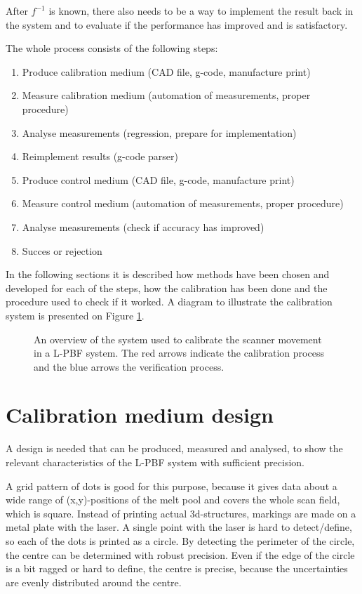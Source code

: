 After $f^{-1}$ is known, there also needs to be a way to implement the result back in the system and to evaluate if the performance has improved and is satisfactory.

The whole process consists of the following steps:
\begin{enumerate}
    \item Produce calibration medium (CAD file, g-code, manufacture print)
    \item Measure calibration medium (automation of measurements, proper procedure)
    \item Analyse measurements (regression, prepare for implementation)
    \item Reimplement results (g-code parser)
    \item Produce control medium (CAD file, g-code, manufacture print)
    \item Measure control medium (automation of measurements, proper procedure)
    \item Analyse measurements (check if accuracy has improved)
    \item Succes or rejection
\end{enumerate}

In the following sections it is described how methods have been chosen and developed for each of the steps, how the calibration has been done and the procedure used to check if it worked. A diagram to illustrate the calibration system is presented on Figure \ref{fig:calibration-system}.

\begin{figure}
    \centering
    
    \caption{An overview of the system used to calibrate the scanner movement in a L-PBF system. The red arrows indicate the calibration process and the blue arrows the verification process.}
    \label{fig:calibration-system}
\end{figure}

\section{Calibration medium design}

A design is needed that can be produced, measured and analysed, to show the relevant characteristics of the L-PBF system with sufficient precision.

A grid pattern of dots is good for this purpose, because it gives data about a wide range of (x,y)-positions of the melt pool and covers the whole scan field, which is square. Instead of printing actual 3d-structures, markings are made on a metal plate with the laser. A single point with the laser is hard to detect/define, so each of the dots is printed as a circle. By detecting the perimeter of the circle, the centre can be determined with robust precision. Even if the edge of the circle is a bit ragged or hard to define, the centre is precise, because the uncertainties are evenly distributed around the centre.

